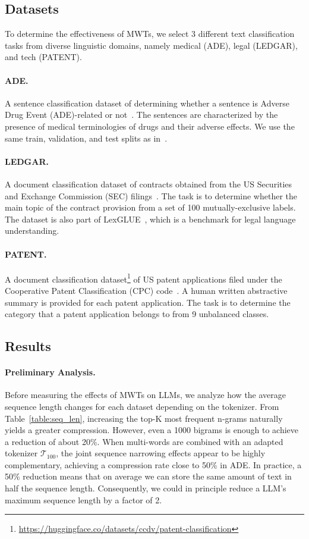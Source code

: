 \documentclass[11pt]{article}
\def\tok100{\mathcal{T}_{100}}
\begin{document}
\subsection{Datasets}
To determine the effectiveness of MWTs, we select 3 different text classification tasks from diverse linguistic domains, namely medical (ADE), legal (LEDGAR), and tech (PATENT).

\paragraph{ADE.} A sentence classification dataset of determining whether a sentence is Adverse Drug Event (ADE)-related or not~\citep{ADE}. The sentences are characterized by the presence of medical terminologies of drugs and their adverse effects. We use the same train, validation, and test splits as in~\citet{FVT}.

\paragraph{LEDGAR.} A document classification dataset of contracts obtained from the US Securities and Exchange Commission (SEC) filings~\citep{LEDGAR}. The task is to determine whether the main topic of the contract provision from a set of 100 mutually-exclusive labels. The dataset is also part of LexGLUE~\citep{LexGLUE}, which is a benchmark for legal language understanding.

\paragraph{PATENT.} A document classification dataset\footnote{\url{https://huggingface.co/datasets/ccdv/patent-classification}} of US patent applications filed under the Cooperative Patent Classification (CPC) code~\citep{PATENT}. A human written abstractive summary is provided for each patent application. The task is to determine the category that a patent application belongs to from 9 unbalanced classes.


\subsection{Results}

\paragraph{Preliminary Analysis.}
Before measuring the effects of MWTs on LLMs, we analyze how the average sequence length changes for each dataset depending on the tokenizer. From Table~\ref{table:seq_len}, increasing the top-K most frequent n-grams naturally yields a greater compression. However, even a 1000 bigrams is enough to achieve a reduction of about 20\%. When multi-words are combined with an adapted tokenizer $\tok100$, the joint sequence narrowing effects appear to be highly complementary, achieving a compression rate close to 50\% in ADE. In practice, a 50\% reduction means that on average we can store the same amount of text in half the sequence length. Consequently, we could in principle reduce a LLM's maximum sequence length by a factor of 2.
\end{document}
